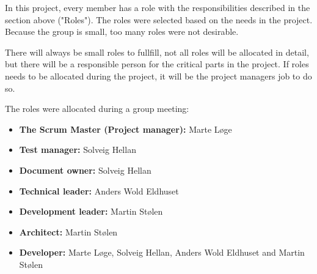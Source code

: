 In this project, every member has a role with the responsibilities described in the section above ("Roles").
The roles were selected based on the needs in the project. Because the group is small, too many roles were not desirable.

There will always be small roles to fullfill, not all roles will be allocated in detail, but there will be a responsible person for the critical parts in the project. If roles needs to be allocated during the project, it will be the project managers job to do so.

The roles were allocated during a group meeting:
\begin{itemize}
  \item {\bf The Scrum Master (Project manager):} Marte Løge
  \item {\bf Test manager:} Solveig Hellan
  \item {\bf Document owner:} Solveig Hellan
  \item {\bf Technical leader:} Anders Wold Eldhuset
  \item {\bf Development leader:} Martin Stølen
  \item {\bf Architect:} Martin Stølen
  \item {\bf Developer:} Marte Løge, Solveig Hellan, Anders Wold Eldhuset and Martin Stølen
\end{itemize}





